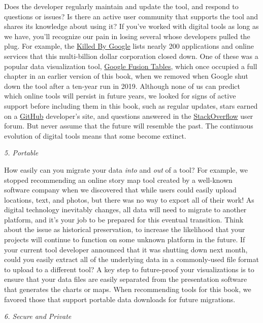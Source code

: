 \documentclass[
  english,
]{book}
\begin{document}
Does the developer regularly maintain and update the tool, and respond to questions or issues? Is there an active user community that supports the tool and shares its knowledge about using it? If you've worked with digital tools as long as we have, you'll recognize our pain in losing several whose developers pulled the plug. For example, the \href{https://killedbygoogle.com}{Killed By Google} lists nearly 200 applications and online services that this multi-billion dollar corporation closed down. One of these was a popular data visualization tool, \href{https://en.wikipedia.org/wiki/Google_Fusion_Tables}{Google Fusion Tables}, which once occupied a full chapter in an earlier version of this book, when we removed when Google shut down the tool after a ten-year run in 2019. Although none of us can predict which online tools will persist in future years, we looked for signs of active support before including them in this book, such as regular updates, stars earned on a \href{https://github.com}{GitHub} developer's site, and questions answered in the \href{https://stackoverflow.com}{StackOverflow} user forum. But never assume that the future will resemble the past. The continuous evolution of digital tools means that some become extinct.

\emph{5. Portable}

How easily can you migrate your data \emph{into} and \emph{out} of a tool? For example, we stopped recommending an online story map tool created by a well-known software company when we discovered that while users could easily upload locations, text, and photos, but there was no way to export all of their work! As digital technology inevitably changes, all data will need to migrate to another platform, and it's your job to be prepared for this eventual transition. Think about the issue as historical preservation, to increase the likelihood that your projects will continue to function on some unknown platform in the future. If your current tool developer announced that it was shutting down next month, could you easily extract all of the underlying data in a commonly-used file format to upload to a different tool? A key step to future-proof your visualizations is to ensure that your data files are easily separated from the presentation software that generates the charts or maps. When recommending tools for this book, we favored those that support portable data downloads for future migrations.

\emph{6. Secure and Private}
\end{document}
